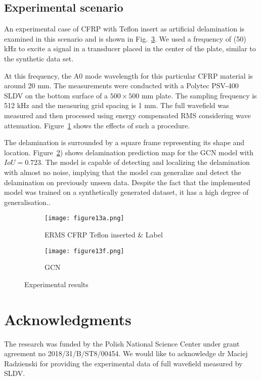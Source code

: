 \documentclass[runningheads]{llncs}
\begin{document}
\subsection{Experimental scenario}
An experimental case of CFRP with Teflon insert as artificial delamination is examined in this scenario and is shown in Fig.~\ref{fig:Exp_ERMS_teflon}.
We used a frequency of (50) kHz to excite a signal in a transducer placed in the center of the plate, similar to the synthetic data set. 

At this frequency, the A0 mode wavelength for this particular CFRP material is around 20 mm.
The measurements were conducted with a Polytec PSV-400 SLDV on the bottom surface of a \(500 \times 500\) mm plate.
The sampling frequency is 512 kHz and the measuring grid spacing is 1 mm.
The full wavefield was measured and then processed using energy compensated RMS considering wave attenuation.
Figure~\ref{fig:Delamination} shows the effects of such a procedure.

The delamination is surrounded by a square frame representing its shape and location. 
Figure~\ref{fig:gcn_exp}) shows delamination prediction map for the GCN model with \(IoU = 0.723\). 
The model is capable of detecting and localizing the delamination with almost no noise, implying that the model can generalize and detect the delamination on previously unseen data.
Despite the fact that the implemented model was trained on a synthetically generated dataset, it has a high degree of generalisation.. 
\begin{figure} [!ht]
	\centering
	\begin{subfigure}[b]{0.47\textwidth}
		\centering
		\texttt{[image: figure13a.png]}
		\caption{ERMS CFRP Teflon inserted \& Label}
		\label{fig:Delamination}	
	\end{subfigure}	
	\begin{subfigure}[b]{0.47\textwidth}
		\centering
		\texttt{[image: figure13f.png]}
		\caption{GCN} 
		\label{fig:gcn_exp}
	\end{subfigure}
	\caption{Experimental results}
	\label{fig:Exp_ERMS_teflon}
\end{figure}
\section*{Acknowledgments}
The research was funded by the Polish National Science Center under grant agreement no 2018/31/B/ST8/00454.
We would like to acknowledge dr Maciej Radzienski for providing the experimental data of full wavefield measured by SLDV.



\end{document}
